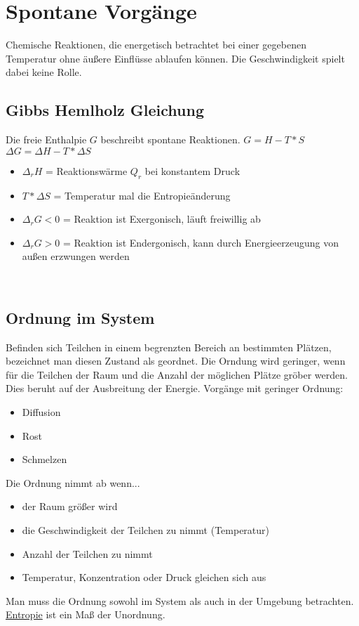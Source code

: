 \section{Spontane Vorgänge} \label{sec:spontane_vorgaenge}
Chemische Reaktionen, die energetisch betrachtet bei einer gegebenen Temperatur ohne äußere Einflüsse ablaufen können.
Die Geschwindigkeit spielt dabei keine Rolle.

\subsection{Gibbs Hemlholz Gleichung}
Die freie Enthalpie $G$ beschreibt spontane Reaktionen. \newline
$G = H - T * S$ 
$\Delta G = \Delta H - T * \Delta S$ 
\begin{itemize}
    \item $\Delta _rH$ = Reaktionswärme $Q_r$ bei konstantem Druck
    \item $T * \Delta S$ = Temperatur mal die Entropieänderung
    \item $\Delta_rG < 0$ = Reaktion ist Exergonisch, läuft freiwillig ab
    \item $\Delta_rG > 0$ = Reaktion ist Endergonisch, kann durch Energieerzeugung von außen erzwungen werden
\end{itemize}
\

\subsection{Ordnung im System}
Befinden sich Teilchen in einem begrenzten Bereich an bestimmten Plätzen, 
bezeichnet man diesen Zustand als geordnet. 
Die Orndung wird geringer,
wenn für die Teilchen der Raum und die Anzahl der möglichen Plätze gröber werden.
Dies beruht auf der Ausbreitung der Energie. \newline
Vorgänge mit geringer Ordnung:
\begin{multicols}{3}
    \begin{itemize}
        \item Diffusion
        \item Rost
        \item Schmelzen
    \end{itemize}
\end{multicols}

Die Ordnung nimmt ab wenn...
\begin{multicols}{2}
    \begin{itemize}
        \item der Raum größer wird
        \item die Geschwindigkeit der Teilchen zu nimmt (Temperatur)
        \item Anzahl der Teilchen zu nimmt
        \item Temperatur, Konzentration oder Druck gleichen sich aus
    \end{itemize}
\end{multicols}

Man muss die Ordnung sowohl im System als auch in der Umgebung betrachten. 
\hyperref[sec:entropie]{Entropie} ist ein Maß der Unordnung.
